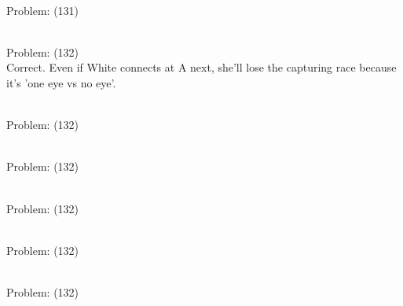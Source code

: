 \documentclass[11pt]{article}
\begin{document}
\begin{minipage}[t]{0.5\textwidth}
  {\centering
  
\\
Problem: (131)\\
  }
\end{minipage}
\begin{minipage}[t]{0.5\textwidth}
  {\centering
  
\\
Problem: (132)\\
Correct. Even if White connects at A next, she'll lose the capturing race because it's 'one eye vs no eye'.\\
  }
\end{minipage}
\begin{minipage}[t]{0.5\textwidth}
  {\centering
  
\\
Problem: (132)\\
  }
\end{minipage}
\begin{minipage}[t]{0.5\textwidth}
  {\centering
  
\\
Problem: (132)\\
  }
\end{minipage}
\begin{minipage}[t]{0.5\textwidth}
  {\centering
  
\\
Problem: (132)\\
  }
\end{minipage}
\begin{minipage}[t]{0.5\textwidth}
  {\centering
  
\\
Problem: (132)\\
  }
\end{minipage}
\begin{minipage}[t]{0.5\textwidth}
  {\centering
  
\\
Problem: (132)\\
  }
\end{minipage}
\end{document}
